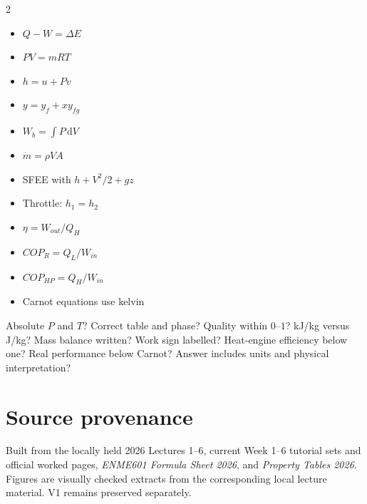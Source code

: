 \documentclass[10pt,a4paper]{article}
\newcommand{\dd}{\,\mathrm{d}}\newcommand{\unit}[1]{\,\mathrm{#1}}
\begin{document}
\begin{quick}
\begin{multicols}{2}
\begin{itemize}
\item $Q-W=\Delta E$
\item $PV=mRT$
\item $h=u+Pv$
\item $y=y_f+xy_{fg}$
\item $W_b=\int P\dd V$
\item $\dot m=\rho VA$
\item SFEE with $h+V^2/2+gz$
\item Throttle: $h_1=h_2$
\item $\eta=W_{out}/Q_H$
\item $COP_R=Q_L/W_{in}$
\item $COP_{HP}=Q_H/W_{in}$
\item Carnot equations use kelvin
\end{itemize}
\end{multicols}
\end{quick}

\begin{trap}
Absolute $P$ and $T$? Correct table and phase? Quality within $0$--$1$? kJ/kg versus J/kg? Mass balance written? Work sign labelled? Heat-engine efficiency below one? Real performance below Carnot? Answer includes units and physical interpretation?
\end{trap}

\section{Source provenance}
Built from the locally held 2026 Lectures 1--6, current Week 1--6 tutorial sets and official worked pages, \textit{ENME601 Formula Sheet 2026}, and \textit{Property Tables 2026}. Figures are visually checked extracts from the corresponding local lecture material. V1 remains preserved separately.
\end{document}
